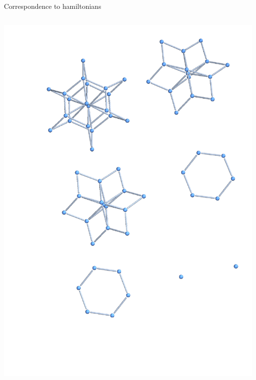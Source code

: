 {\begin{frame}{Correspondence to hamiltonians}
\begin{columns}[T]
{\begin{column}{0.33\textwidth}
    		\includegraphics[trim=0 0 0 0mm, width=\textwidth]{Images/ring6_hamilton_graph3d}
		\end{column}}
\end{columns}
\end{frame}}
